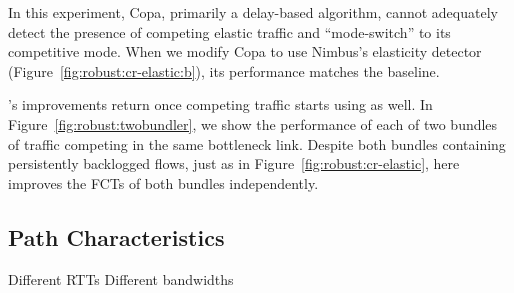 In this experiment, Copa, primarily a delay-based algorithm, cannot adequately detect the presence of competing elastic traffic and ``mode-switch'' to its competitive mode. When we modify Copa to use Nimbus's elasticity detector (Figure~\ref{fig:robust:cr-elastic:b}), its performance matches the baseline.

 


 \name's improvements return once competing traffic starts using \name as well. In Figure~\ref{fig:robust:twobundler}, we show the performance of each of two bundles of traffic competing in the same bottleneck link. 
Despite both bundles containing persistently backlogged flows, just as in Figure~\ref{fig:robust:cr-elastic}, here \name improves the FCTs of both bundles independently.

\subsection{Path Characteristics}\label{s:robust:path}
 
\begin{outline}
\1 Different RTTs
\1 Different bandwidths
\end{outline}